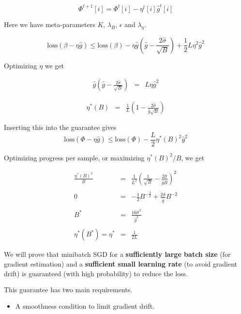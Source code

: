 {\vfill
$$\Phi^{t+1}[i] = \Phi^t[i] - \eta^t[i] \hat{g}^t[i]$$

\vfill
Here we have meta-parameters $K$, $\lambda_B$, $\epsilon$ and $\lambda_\eta$.


$$\mathrm{loss}(\beta - \eta\hat{g}) \leq \mathrm{loss}(\beta) - \eta \hat{g}\left(\hat{g} - \frac{2\hat{\sigma}}{\sqrt{B}} \right)  + \frac{1}{2}L \eta^2 \hat{g}^2$$

Optimizing $\eta$ we get

\begin{eqnarray*}
 \hat{g}\left(\hat{g} - \frac{2\hat{\sigma}}{\sqrt{B}} \right) & = & L \eta \hat{g}^2
\end{eqnarray*}


\begin{eqnarray*}
\eta^*(B) & = & \frac{1}{L}\left(1 - \frac{2\hat{\sigma}}{\hat{g}\sqrt{B}}\right)
\end{eqnarray*}

\vfill
Inserting this into the guarantee gives
$$\mathrm{loss}(\Phi - \eta \hat{g}) \leq \mathrm{loss}(\Phi) - \frac{L}{2}\eta^*(B)^2\hat{g}^2$$


Optimizing progress per sample, or maximizing $\eta^*(B)^2/B$, we get

\begin{eqnarray*}
\frac{\eta^*(B)^2}{B} & = & \frac{1}{L^2}\left(\frac{1}{\sqrt{B}} - \frac{2\hat{\sigma}}{\hat{g}B}\right)^2 \\
\\
0 & = &  - \frac{1}{2} B^{-\frac{3}{2}} + \frac{2\hat{\sigma}}{\hat{g}} B^{-2} \nonumber \\
\\
B^* & = & \frac{16\hat{\sigma}^2}{\hat{g}^2} \\
\\
\eta^*(B^*) = \eta^*  & = & \frac{1}{2L}
\end{eqnarray*}


We will prove that minibatch SGD for a {\bf sufficiently large batch size} (for gradient estimation) and a {\bf sufficient small learning rate} (to avoid gradient drift)
is guaranteed (with high probability) to reduce the loss.

\vfill
This guarantee has two main requirements.

\vfill
\begin{itemize}
\item A smoothness condition to limit gradient drift.


\end{itemize}}
